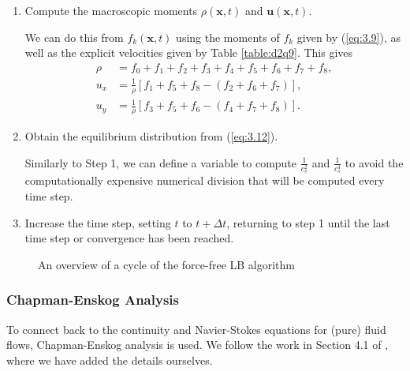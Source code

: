 \documentclass[a4paper, 11pt]{report}
\begin{document}
\begin{enumerate}
    \item Compute the macroscopic moments $\rho(\mathbf{x},t)$ and $\mathbf{u}(\mathbf{x},t)$. \par We can do this from $f_k(\mathbf{x},t)$ using the moments of $f_k$ given by (\ref{eq:3.9}), as well as the explicit velocities given by Table \ref{table:d2q9}. This gives
    \begin{subequations}
        \begin{align}
            \rho &= f_0 + f_1 + f_2 + f_3 + f_4 + f_5 + f_6 + f_7 + f_8, \label{eq:3.18a}\\
            u_x &= \frac{1}{\rho}\left[f_1 + f_5 + f_8 - (f_2 + f_6 + f_7)\right], \label{eq:3.18b}\\
            u_y &= \frac{1}{\rho}\left[f_3 + f_5 + f_6 - (f_4 + f_7 + f_8)\right]. \label{eq:3.18c}
        \end{align}
    \end{subequations}
    \item Obtain the equilibrium distribution from (\ref{eq:3.12}). \par Similarly to Step 1, we can define a variable to compute $\frac{1}{c_s^2}$ and $\frac{1}{c_s^4}$ to avoid the computationally expensive numerical division that will be computed every time step. 
    \item Increase the time step, setting $t$ to $t+\Delta t$, returning to step 1 until the last time step or convergence has been reached. 
\end{enumerate}

\begin{figure}[!htb]
\centering

\caption{An overview of a cycle of the force-free LB algorithm} \label{fig:ffalgo}
\end{figure}
\newpage
\subsubsection{Chapman-Enskog Analysis}
To connect back to the continuity and Navier-Stokes equations for (pure) fluid flows, Chapman-Enskog analysis is used. We follow the work in Section 4.1 of \cite{lbtextbook}, where we have added the details ourselves.

\end{document}
